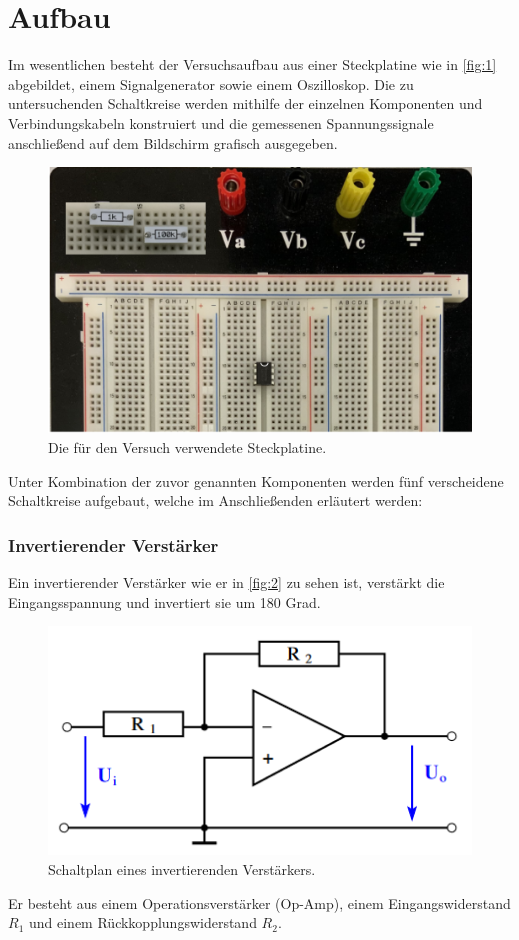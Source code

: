 \documentclass[12pt]{article}
\begin{document}
\section{Aufbau}
Im wesentlichen besteht der Versuchsaufbau aus einer Steckplatine wie in \autoref{fig:1} abgebildet, einem Signalgenerator sowie einem Oszilloskop. Die zu untersuchenden Schaltkreise werden mithilfe der einzelnen Komponenten und Verbindungskabeln konstruiert und die gemessenen Spannungssignale anschließend auf dem Bildschirm grafisch ausgegeben.
\begin{figure}[H]
  \centering
  \includegraphics[scale=0.5]{Ressourcen/breadbord.png}
  \caption{Die für den Versuch verwendete Steckplatine\cite{anleitung}.}\label{fig:1}
\end{figure}
Unter Kombination der zuvor genannten Komponenten werden fünf verscheidene Schaltkreise aufgebaut, welche im Anschließenden erläutert werden:
\subsubsection{Invertierender Verstärker}

Ein invertierender Verstärker wie er in \autoref{fig:2} zu sehen ist, verstärkt die Eingangsspannung und invertiert sie um 180 Grad.
\begin{figure}[H]
  \centering
  \includegraphics[scale=0.8]{Ressourcen/invamp.png}
  \caption{Schaltplan eines invertierenden Verstärkers\cite{anleitung}.}\label{fig:2}
\end{figure}
Er besteht aus einem Operationsverstärker (Op-Amp), einem Eingangswiderstand \( R_1 \) und einem Rückkopplungswiderstand \( R_2 \).
\end{document}
